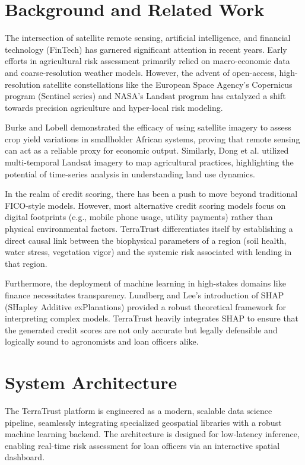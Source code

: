 \documentclass[conference]{IEEEtran}
\begin{document}
\section{\textbf{Background and Related Work}}
The intersection of satellite remote sensing, artificial intelligence, and financial technology (FinTech) has garnered significant attention in recent years. Early efforts in agricultural risk assessment primarily relied on macro-economic data and coarse-resolution weather models. However, the advent of open-access, high-resolution satellite constellations like the European Space Agency's Copernicus program (Sentinel series) and NASA's Landsat program has catalyzed a shift towards precision agriculture and hyper-local risk modeling.

Burke and Lobell \cite{b1} demonstrated the efficacy of using satellite imagery to assess crop yield variations in smallholder African systems, proving that remote sensing can act as a reliable proxy for economic output. Similarly, Dong et al. \cite{b2} utilized multi-temporal Landsat imagery to map agricultural practices, highlighting the potential of time-series analysis in understanding land use dynamics.

In the realm of credit scoring, there has been a push to move beyond traditional FICO-style models. However, most alternative credit scoring models focus on digital footprints (e.g., mobile phone usage, utility payments) rather than physical environmental factors. TerraTrust differentiates itself by establishing a direct causal link between the biophysical parameters of a region (soil health, water stress, vegetation vigor) and the systemic risk associated with lending in that region.

Furthermore, the deployment of machine learning in high-stakes domains like finance necessitates transparency. Lundberg and Lee's \cite{b4} introduction of SHAP (SHapley Additive exPlanations) provided a robust theoretical framework for interpreting complex models. TerraTrust heavily integrates SHAP to ensure that the generated credit scores are not only accurate but legally defensible and logically sound to agronomists and loan officers alike.

\section{\textbf{System Architecture}}
The TerraTrust platform is engineered as a modern, scalable data science pipeline, seamlessly integrating specialized geospatial libraries with a robust machine learning backend. The architecture is designed for low-latency inference, enabling real-time risk assessment for loan officers via an interactive spatial dashboard.
\end{document}
